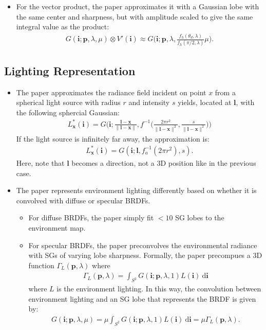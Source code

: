 \documentclass[10pt]{article}
\newcommand{\dee}{\mathrm{d}}
\newcommand{\ve}[1]{\mathbf{#1}}
\begin{document}
\begin{itemize}
    \item For the vector product, the paper approximates it with a Gaussian lobe with the same center and sharpness, but with amplitude scaled to give the same integral value as the product:
    \begin{align*}
      G(\ve{i}; \ve{p}, \lambda, \mu) \otimes V'(\ve{i}) \approx G\bigg(\ve{i}; \ve{p}, \lambda, \frac{f_h(\theta_d, \lambda)}{f_h(\pi/2, \lambda)}\mu \bigg).
    \end{align*}
  \end{itemize}

  \subsection{Lighting Representation}

  \begin{itemize}
    \item The paper approximates the radiance field incident on point $x$ from a spherical light source with radius $r$ and intensity $s$ yields, located at $\ve{l}$, with the following sphercial Gaussian:
    \begin{align*}
       L_\ve{x}^*(\ve{i}) = G\bigg( \ve{i}; \frac{\ve{l} - \ve{x}}{\| \ve{l} - \ve{x} \|}, f^{-1}\bigg( \frac{2\pi r^2}{\| \ve{l} - \ve{x} \|^2}, \frac{s}{\| \ve{l} - \ve{x} \|^2} \bigg) \bigg)
     \end{align*} 
     If the light source is infinitely far away, the approximation is:
     \begin{align*}
       L_\ve{x}^*(\ve{i}) = G(\ve{i}; \ve{l}, f_a^{-1}(2\pi r^2), s).
     \end{align*}
     Here, note that $\ve{l}$ becomes a direction, not a 3D position like in the previous case.

    \item The paper represents environment lighting differently based on whether it is convolved with diffuse or specular BRDFs.
    \begin{itemize}       
        \item For diffuse BRDFs, the paper simply fit $< 10$ SG lobes to the environment map.

        \item For specular BRDFs, the paper preconvolves the environmental radiance with SGs of varying lobe sharpness.  Formally, the paper precompues a 3D function $\Gamma_L(\ve{p}, \lambda)$ where
        \begin{align*}
          \Gamma_L(\ve{p}, \lambda) = \int_{S^2} G(\ve{i};\ve{p}, \lambda, 1) L(\ve{i})\ \dee \ve{i}
        \end{align*}
        where $L$ is the environment lighting.  In this way, the convolution between environment lighting and an SG lobe that represents the BRDF is given by:
        \begin{align*}
          G(\ve{i}; \ve{p}, \lambda, \mu) = \mu \int_{S^2} G(\ve{i}; \ve{p}, \lambda, 1) L(\ve{i})\ \dee\ve{i} = \mu \Gamma_L(\ve{p}, \lambda).
        \end{align*}
    \end{itemize}     
  \end{itemize}
\end{document}
